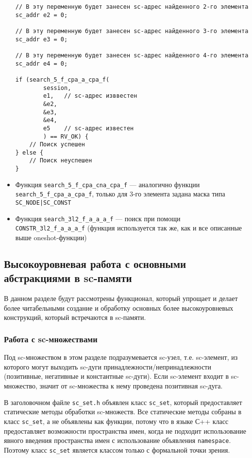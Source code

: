 \begin{itemize}
\begin{lstlisting}[texcl]
// В эту переменную будет занесен sc-адрес найденного 2-го элемента
sc_addr e2 = 0;

// В эту переменную будет занесен sc-адрес найденного 3-го элемента
sc_addr e3 = 0;

// В эту переменную будет занесен sc-адрес найденного 4-го элемента
sc_addr e4 = 0;

if (search_5_f_cpa_a_cpa_f(
        session,
        e1,   // sc-адрес изввестен
        &e2,
        &e3,
        &e4,
        e5    // sc-адрес известен
        ) == RV_OK) {
    // Поиск успешен
} else {
    // Поиск неуспешен
}
\end{lstlisting}

\item Функция \lstinline|search_5_f_cpa_cna_cpa_f| --- аналогично функции
  \lstinline|search_5_f_cpa_a_cpa_f|, только для 3-го элемента
  задана маска типа \lstinline+SC_NODE|SC_CONST+

\item Функция \lstinline|search_3l2_f_a_a_a_f| --- поиск при помощи
  \lstinline|CONSTR_3l2_f_a_a_a_f| (функция используется так же, как и
  все описанные выше oneshot-функции)
\end{itemize}

\subsection{Высокоуровневая работа с основными абстракциями в sc-памяти}
\label{sec:libsc_high}

В данном разделе будут рассмотрены функционал, который упрощает и
делает более читабельными создание и обработку основных более
высокоуровневых конструкций, который встречаются в sc-памяти.

\subsubsection{Работа с sc-множествами}
\label{sec:libsc_sc_set}

Под sc-множеством в этом разделе подразумевается sc-узел,
т.е. sc-элемент, из которого могут выходить sc-дуги
принадлежности/непринадлежности (позитивные, негативные и константные
sc-дуги). Если sc-элемент входит в sc-множество, значит от
sc-множества к нему проведена позитивная sc-дуга.

В заголовочном файле \verb|sc_set.h| объявлен класс
\lstinline|sc_set|, который предоставляет статические методы обработки
sc-множеств. Все статические методы собраны в класс
\lstinline|sc_set|, а не объявлены как функции, потому что в языке С++
класс предоставляет возможности пространства имен, когда не подходит
использование явного введения пространства имен с использование
объявления \lstinline|namespace|. Поэтому класс \lstinline|sc_set|
является классом только с формальной точки зрения.

